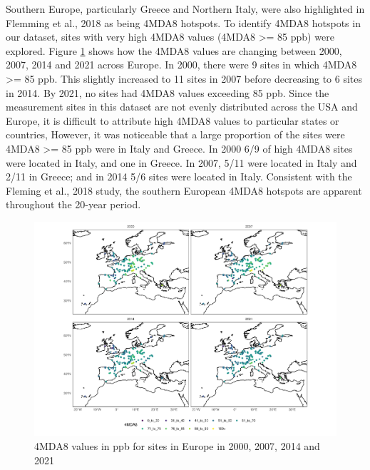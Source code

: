 \documentclass[journal abbreviation, manuscript]{copernicus}
\begin{document}
Southern Europe, particularly Greece and Northern Italy, were also highlighted in Flemming et al., 2018 as being 4MDA8 hotspots. To identify 4MDA8 hotspots in our dataset, sites with very high 4MDA8 values (4MDA8 >= 85 ppb) were explored. Figure \ref{fig:eu_4mda8_map} shows how the 4MDA8 values are changing between 2000, 2007, 2014 and 2021 across Europe. In 2000, there were 9 sites in which 4MDA8 >= 85 ppb. This slightly increased to 11 sites in 2007 before decreasing to 6 sites in 2014. By 2021, no sites had 4MDA8 values exceeding 85 ppb. Since the measurement sites in this dataset are not evenly distributed across the USA and Europe, it is difficult to attribute high 4MDA8 values to particular states or countries, However, it was noticeable that a large proportion of the sites were 4MDA8 >= 85 ppb were in Italy and Greece. In 2000 6/9 of high 4MDA8 sites were located in Italy, and one in Greece. In 2007, 5/11 were located in Italy and 2/11 in Greece; and in 2014 5/6 sites were located in Italy. Consistent with the Fleming et al., 2018 study, the southern European 4MDA8 hotspots are apparent throughout the 20-year period. 

\begin{figure}[h]
\includegraphics[width=12cm]{figures/f12_4mda8_eu.pdf}
\caption{4MDA8 values in ppb for sites in Europe in 2000, 2007, 2014 and 2021}
\label{fig:eu_4mda8_map}
\end{figure}
\end{document}
